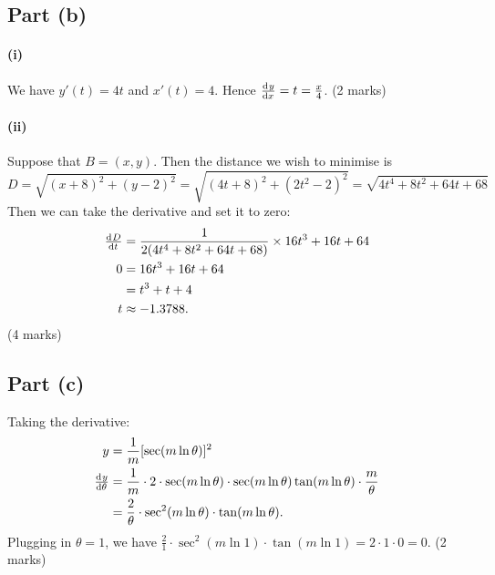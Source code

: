 \documentclass[a4paper]{report}
\begin{document}
\subsection*{Part (b)}
\paragraph{(i)}
We have $ y'(t) = 4t $ and $ x'(t) = 4 $. Hence $ \od{y}{x} = t = \frac{x}{4} $. (2 marks)

\paragraph{(ii)}
Suppose that $ B = (x,y) $. Then the distance we wish to minimise is
\begin{displaymath}
  D = \sqrt{(x + 8)^2 + (y - 2)^2} = \sqrt{(4t + 8)^2 + (2t^2 - 2)^2} = \sqrt{4t^4 + 8t^2 + 64t + 68}
\end{displaymath}
Then we can take the derivative and set it to zero:
\begin{align*}
  \od{D}{t} &= \frac{1}{2(4t^4 + 8t^2 + 64t + 68)} \times 16t^3 + 16t + 64\\
  0 &= 16t^3 + 16t + 64\\
    &= t^3 + t + 4\\
  t &\approx -1.3788.
\end{align*}
(4 marks)

\subsection*{Part (c)}
Taking the derivative:
\begin{align*}
  y &= \frac{1}{m} [\sec(m \ln \theta)]^2\\
  \od{y}{\theta} &= \frac{1}{m} \cdot 2 \cdot \sec (m \ln \theta) \cdot \sec(m \ln \theta) \tan(m \ln \theta) \cdot \frac{m}{\theta}\\
                 &= \frac{2}{\theta} \cdot \sec^2(m \ln \theta) \cdot \tan(m \ln \theta).
\end{align*}
Plugging in $ \theta = 1 $, we have $ \frac{2}{1} \cdot \sec^2(m \ln 1) \cdot \tan(m \ln 1) = 2 \cdot 1 \cdot 0 = 0 $.
(2 marks)
\end{document}
